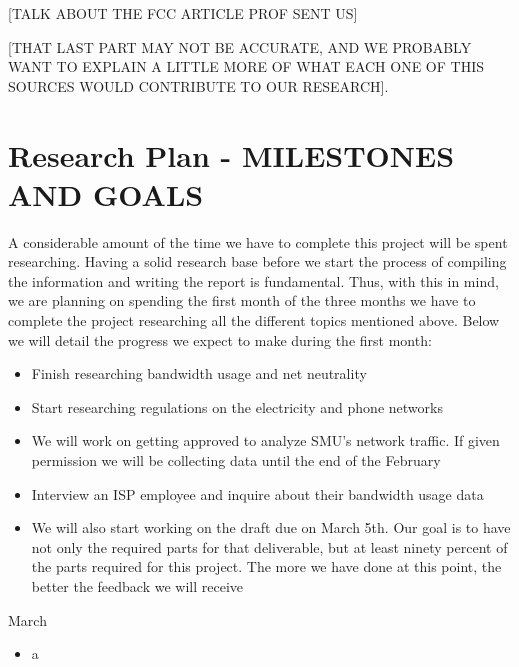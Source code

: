 \documentclass{sigcomm-alternate}
\begin{document}
[TALK ABOUT THE FCC ARTICLE PROF SENT US]




[THAT LAST PART MAY NOT BE ACCURATE, AND WE PROBABLY WANT TO EXPLAIN A LITTLE MORE OF WHAT EACH ONE OF THIS SOURCES WOULD CONTRIBUTE TO OUR RESEARCH].


\cite{FCCTomWheeler}



\section{Research Plan - MILESTONES AND GOALS}


A considerable amount of the time we have to complete this project will be spent researching. Having a solid research base before we start the process of compiling the information and writing the report is fundamental. Thus, with this in mind, we are planning on spending the first month of the three months we have to complete the project researching all the different topics mentioned above. Below we will detail the progress we expect to make during the first month:


\begin{itemize}
	
	\item Finish researching bandwidth usage and net neutrality
	
	\item Start researching regulations on the electricity and phone networks
	
	\item We will work on getting approved to analyze SMU's network traffic. If given permission we will be collecting data until the end of the February
		
	\item Interview an ISP employee and inquire about their bandwidth usage data
		
	\item We will also start working on the draft due on March 5th. Our goal is to have not only the required parts for that deliverable, but at least ninety percent of the parts required for this project. The more we have done at this point, the better the feedback we will receive%
		
\end{itemize}



March
\begin{itemize}
	\item a
\end{itemize}
\end{document}
